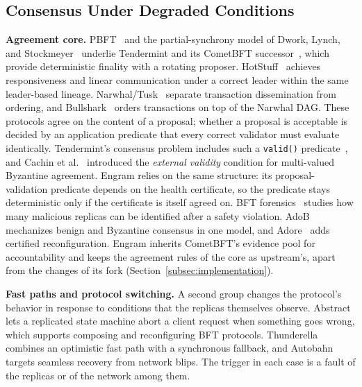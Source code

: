 \subsection{Consensus Under Degraded Conditions}
\label{subsec:rw-degraded}
\textbf{Agreement core.}
PBFT~\cite{castro1999pbft} and the partial-synchrony model of Dwork, Lynch,
and Stockmeyer~\cite{dwork1988consensus} underlie Tendermint and its CometBFT
successor~\cite{buchman2016tendermint,buchman2018gossip}, which provide
deterministic finality with a rotating proposer. HotStuff~\cite{yin2019hotstuff}
achieves responsiveness and linear communication under a correct leader within the same
leader-based lineage. Narwhal/Tusk~\cite{danezis2022narwhal} separate
transaction dissemination from ordering, and Bullshark~\cite{spiegelman2022bullshark}
orders transactions on top of the Narwhal DAG. These protocols agree on the content of a proposal; whether
a proposal is acceptable is decided by an application predicate that every
correct validator must evaluate identically. Tendermint's consensus problem
includes such a \texttt{valid()} predicate~\cite{buchman2018gossip}, and Cachin
et al.~\cite{cachin2001secure} introduced the \emph{external validity}
condition for multi-valued Byzantine agreement. Engram relies on the
same structure: its proposal-validation predicate depends on the health
certificate, so the predicate stays deterministic only if the certificate is
itself agreed on. BFT forensics~\cite{sheng2021forensics} studies how many malicious replicas
can be identified after a safety violation. AdoB~\cite{honore2024adob}
mechanizes benign and Byzantine consensus in one model, and
Adore~\cite{honore2022adore} adds certified reconfiguration. Engram inherits
CometBFT's evidence pool for accountability and keeps the agreement rules of the
core as upstream's, apart from the changes of its fork
(Section~\ref{subsec:implementation}).

\textbf{Fast paths and protocol switching.}
A second group changes the protocol's behavior in response to conditions that
the replicas themselves observe. Abstract~\cite{aublin2015next700} lets a replicated
state machine abort a client request when something goes wrong, which supports
composing and reconfiguring BFT protocols. Thunderella~\cite{pass2018thunderella} combines an
optimistic fast path with a synchronous fallback, and
Autobahn~\cite{giridharan2024autobahn} targets seamless recovery from network
blips. The trigger in each case is a fault of the replicas or of the network
among them.

